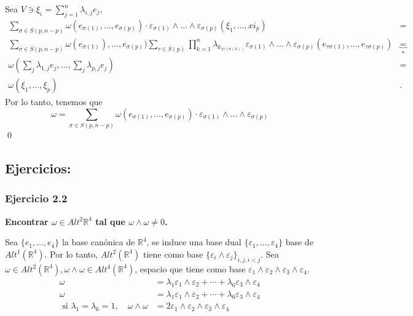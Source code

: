 Sea $V\ni\xi_i=\sum_{j=1}^n \lambda_{i,j}e_j$,
\begin{equation}
  \begin{split}
    \sum_{\sigma\in S(p,n-p)}\omega (e_{\sigma(1)},\dots,e_{\sigma(p)})\cdot \varepsilon_{\sigma(1)}\wedge \dots \wedge \varepsilon_{\sigma(p)}(\xi_1,\dots,xi_p) &= \\
    \sum_{\sigma\in S(p,n-p)}\omega(e_{\sigma(1)}),\dots, e_{\sigma(p)})\sum_{\tau\in S(p)}\prod_{k=1}^n\lambda_{k_{1\tau(\sigma(k))}}\varepsilon_{\sigma(1)}\wedge \dots \wedge \varepsilon_{\sigma(p)}(e_{\tau\sigma(1)},\dots,e_{\tau\sigma(p)})&\underbrace{=}_* \\
    \omega(\sum_j\lambda_{1,j}e_j,\dots,\sum_j\lambda_{p,j}e_j)&= \\
    \omega(\xi_1,\dots,\xi_p)&.
  \end{split}
\end{equation}
Por lo tanto, tenemos que
$$\omega =\sum_{\sigma\in S(p,n-p)}\omega (e_{\sigma(1)},\dots,e_{\sigma(p)})\cdot \varepsilon_{\sigma(1)}\wedge \dots \wedge \varepsilon_{\sigma(p)}$$ \qed

\subsection{Ejercicios:}

\subsubsection{Ejercicio 2.2}

\textbf{Encontrar $\omega\in Alt^2\mathbb{R}^4$ tal que $\omega\wedge \omega \neq 0$.}

Sea $\{e_1,\dots,e_4\}$ la base canónica de $\mathbb{R}^4$, se induce una base dual $\{\varepsilon_1,\dots,\varepsilon_4\}$ base de $Alt^1(\mathbb{R}^4)$. Por lo tanto, $Alt^2(\mathbb{R}^4)$ tiene como base $\{\varepsilon_i\wedge \varepsilon_j\}_{i,j,i<j}$. Sea $\omega\in Alt^2(\mathbb{R}^4), \omega\wedge \omega \in Alt^4(\mathbb{R}^4)$, espacio que tiene como base $\varepsilon_1\wedge \varepsilon_2 \wedge \varepsilon_3 \wedge \varepsilon_4$. 
\begin{equation}
  \begin{split}
    \omega &= \lambda_1 \varepsilon_1\wedge \varepsilon_2+\cdots + \lambda_6\varepsilon_3\wedge \varepsilon_4 \\
    \omega &= \lambda_1 \varepsilon_1\wedge \varepsilon_2+\cdots + \lambda_6\varepsilon_3\wedge \varepsilon_4 \\
\text{ si } \lambda_1=\lambda_6=1,\quad \omega\wedge \omega &= 2\varepsilon_1\wedge \varepsilon_2 \wedge \varepsilon_3 \wedge \varepsilon_4
  \end{split}
\end{equation}

